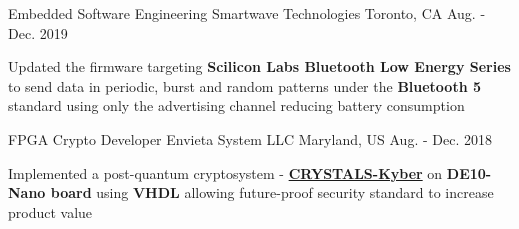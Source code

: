 
\begin{cventries}

\cventry
{Embedded Software Engineering} %
{Smartwave Technologies} %
{Toronto, CA} %
{Aug. - Dec. 2019} %
{ %
\begin{cvitems}
\item {
    Updated the firmware targeting
    \textbf{Scilicon Labs Bluetooth Low Energy Series}
    to send data in periodic, burst and random patterns under the 
    \textbf{Bluetooth 5} standard using only the advertising channel
    reducing battery consumption
}
\end{cvitems}
}
\vspace{2mm}

\cventry
{FPGA Crypto Developer} %
{Envieta System LLC} %
{Maryland, US} %
{Aug. - Dec. 2018} %
{ %
\begin{cvitems}
\item {
    Implemented a post-quantum cryptosystem - 
    \textbf{\href{https://pq-crystals.org/}{CRYSTALS-Kyber}} 
    on \textbf{DE10-Nano board} using \textbf{VHDL} allowing
    future-proof security standard to increase product value
}
\end{cvitems}
}
\vspace{2mm}


\end{cventries}
